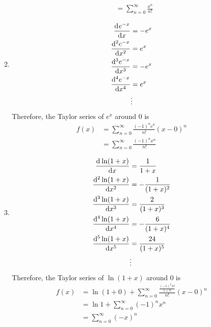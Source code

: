 \documentclass[fleqn, a4paper, 12pt, oneside]{amsart}
\theoremstyle{definition}
\theoremstyle{theorem}
\begin{document}
\begin{solution}
\begin{enumerate}[leftmargin = *]
\begin{align*}
				&= \sum\limits_{n = 0}^{\infty} \frac{x^n}{n!}
			\end{align*}
		\item
			\begin{align*}
				\dod{e^{-x}}{x} &= -e^x\\
				\dod[2]{e^{-x}}{x} &= e^x\\
				\dod[3]{e^{-x}}{x} &= -e^x\\
				\dod[4]{e^{-x}}{x} &= e^x\\
				&\vdots
			\end{align*}
			Therefore, the Taylor series of $e^x$ around $0$ is
			\begin{align*}
				f(x) &= \sum\limits_{n = 0}^{\infty} \frac{(-1)^n e^0}{n!} (x - 0)^n\\
				&= \sum\limits_{n = 0}^{\infty} \frac{(-1)^n x^n}{n!}
			\end{align*}
		\item
			\begin{align*}
				\dod{\ln (1 + x)}{x} &= \frac{1}{1 + x}\\
				\dod[2]{\ln (1 + x)}{x} &= -\frac{1}{(1 + x)^2}\\
				\dod[3]{\ln (1 + x)}{x} &= \frac{2}{(1 + x)^3}\\
				\dod[4]{\ln (1 + x)}{x} &= -\frac{6}{(1 + x)^4}\\
				\dod[5]{\ln (1 + x)}{x} &= \frac{24}{(1 + x)^5}\\
				&\vdots
			\end{align*}
			Therefore, the Taylor series of $\ln (1 + x)$ around $0$ is
			\begin{align*}
				f(x) &= \ln (1 + 0) + \sum\limits_{n = 0}^{\infty} \frac{\frac{(-1)^n n!}{1 + 0}}{n!} (x - 0)^n\\
				&= \ln 1 + \sum\limits_{n = 0}^{\infty} (-1)^n x^n\\
				&= \sum\limits_{n = 0}^{\infty} (-x)^n
			\end{align*}
	\end{enumerate}
\end{solution}
\end{document}
